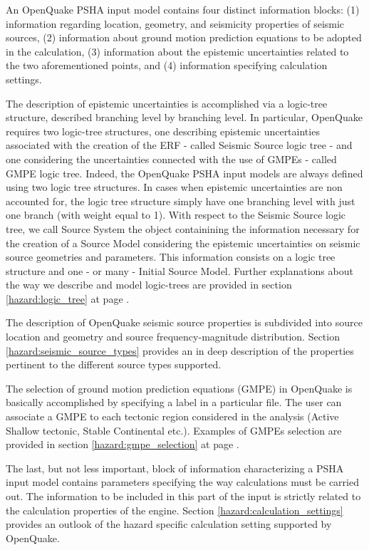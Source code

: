 An OpenQuake PSHA input model contains four distinct information blocks: (1) information regarding location, geometry, and seismicity properties of seismic sources, (2) information about ground motion prediction equations to be  adopted in the calculation, (3) information about the epistemic uncertainties related to the two aforementioned points, and (4) information specifying calculation settings.

The description of epistemic uncertainties is accomplished via a logic-tree 
structure, described branching level by branching level. In particular, OpenQuake requires two logic-tree structures, one describing epistemic uncertainties associated with the creation of the ERF - called Seismic Source logic tree - and one considering the uncertainties connected with the use of GMPEs - called GMPE logic tree. 
%
%
Indeed, the OpenQuake PSHA input models are always defined using two logic tree structures. In cases when epistemic uncertainties are non accounted for, the logic tree structure simply have one branching level with just one branch (with weight equal to 1).
%
With respect to the Seismic Source logic tree, we call Source System the object containining the information necessary for the creation of a Source Model considering the epistemic uncertainties on seismic source geometries and parameters. This information consists on a logic tree structure and one - or many - Initial Source Model.
%
Further explanations about the way we describe and model logic-trees are provided in section \ref{hazard:logic_tree} at page \pageref{hazard:logic_tree}. 

The description of OpenQuake seismic source properties is subdivided into 
source location and geometry and source frequency-magnitude distribution.
%
Section \ref{hazard:seismic_source_types} provides an in deep description of 
the properties pertinent to the different source types supported. 

The selection of ground motion prediction equations (GMPE) in OpenQuake 
is basically accomplished by specifying a label in a particular file.  
The user can associate a GMPE to each tectonic region considered in the 
analysis (Active Shallow tectonic, Stable Continental etc.). Examples of 
GMPEs selection are provided in section \ref{hazard:gmpe_selection} at page 
\pageref{hazard:gmpe_selection}.

The last, but not less important, block of information characterizing a PSHA 
input model contains parameters specifying the way calculations must be 
carried out. The information to be included in this part of the input is 
strictly related to the calculation properties of the engine. Section 
\ref{hazard:calculation_settings} provides an outlook of the hazard specific 
calculation setting supported by OpenQuake. 
%
